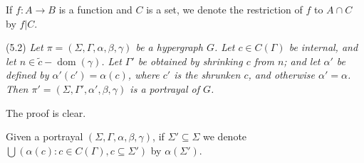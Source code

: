 If $f \colon A \to B$ is a function and $C$ is a set, we denote the restriction of $f$ to $A \cap C$ by $f|C$.

\stmt
(5.2) \textit{Let $\pi = (\Sigma, \Gamma, \alpha, \beta, \gamma)$ be a hypergraph $G$. Let $c \in C(\Gamma)$ be internal, and let $n \in \tilde{c} - \operatorname{dom}(\gamma)$. Let $\Gamma'$ be obtained by shrinking $c$ from $n$; and let $\alpha'$ be defined by $\alpha'(c') = \alpha(c)$, where $c'$ is the shrunken $c$, and otherwise $\alpha' = \alpha$. Then $\pi' = (\Sigma, \Gamma', \alpha', \beta, \gamma)$ is a portrayal of $G$.}

The proof is clear.

Given a portrayal $(\Sigma, \Gamma, \alpha, \beta, \gamma)$, if $\Sigma' \subseteq \Sigma$ we denote $\bigcup(\alpha(c) \colon c \in C(\Gamma), c \subseteq \Sigma')$ by $\alpha(\Sigma')$.
